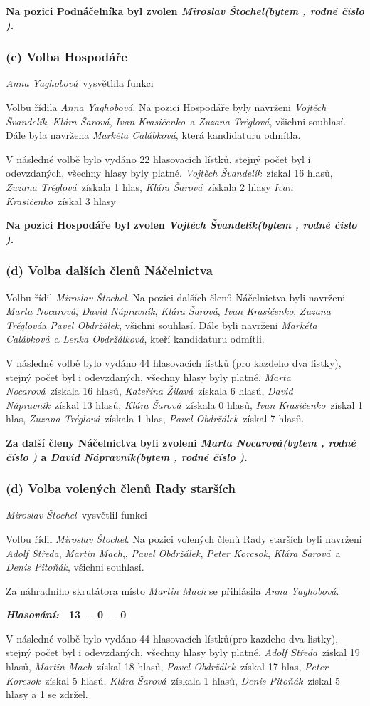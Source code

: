 \documentclass[10pt,a4paper]{report}
\newcommand{\hlas}[3]{
  \begin{flushright}
  {\it\bfseries Hlasování:\/}\ \ {\bfseries #1\ --\ #2\ --\ #3}
  \end{flushright}
}
\newcommand{\pauza}{\vskip 5mm\relax}
\newcommand{\usn}[1]{
  \vskip 5mm\relax
  \noindent{\it\bfseries Usnesení:\/}\nopagebreak
  {\bf #1}
}
\newcommand{\AS}{{\it Adolf Středa\/}}
\newcommand{\AY}{{\it Anna Yaghobová\/}}
\newcommand{\DN}{{\it David Nápravník\/}}
\newcommand{\DP}{{\it Denis Pitoňák\/}}
\newcommand{\IK}{{\it Ivan Krasičenko\/}}
\newcommand{\KZ}{{\it Kateřina Žilavá\/}}
\newcommand{\KS}{{\it Klára Šarová\/}}
\newcommand{\LO}{{\it Lenka Obdržálková\/}}
\newcommand{\MC}{{\it Markéta Calábková\/}}
\newcommand{\MM}{{\it Martin Mach\/}}
\newcommand{\MN}{{\it Marta Nocarová\/}}
\newcommand{\MS}{{\it Miroslav Štochel\/}}
\newcommand{\PO}{{\it Pavel Obdržálek\/}}
\newcommand{\PK}{{\it Peter Korcsok\/}}
\newcommand{\VS}{{\it Vojtěch Švandelík\/}}
\newcommand{\ZT}{{\it Zuzana Tréglová\/}}
\begin{document}
\usn{Na pozici Podnáčelníka byl zvolen
  \MS {\it (bytem \censor{}, rodné číslo \censor{})\/}.}

\subsubsection{(c) Volba Hospodáře}
\AY\ vysvětlila funkci
\pauza

Volbu řídila \AY.
Na pozici Hospodáře byly navrženi \VS, \KS, \IK\ a \ZT, všichni souhlasí.
Dále byla navržena \MC, která kandidaturu odmítla.

V následné volbě bylo vydáno 22 hlasovacích lístků,
stejný počet byl i odevzdaných, všechny hlasy byly platné.
  \VS\ získal 16 hlasů,
  \ZT\ získala 1 hlas,
  \KS\ získala 2 hlasy
  \IK\ získal 3 hlasy
\pauza

\usn{Na pozici Hospodáře byl zvolen
  \VS {\it (bytem \censor{}, rodné číslo \censor{})\/}.}

\subsubsection{(d) Volba dalších členů Náčelnictva}
Volbu řídil \MS.
Na pozici dalších členů Náčelnictva byli navrženi \MN, \DN, \KS, \IK, \ZT a \PO, všichni souhlasí.
Dále byli navrženi \MC\ a \LO, kteří kandidaturu odmítli.
\pauza

V následné volbě bylo vydáno 44 hlasovacích lístků (pro kazdeho dva listky),
stejný počet byl i odevzdaných, všechny hlasy byly platné.
  \MN\ získala 16 hlasů,
  \KZ\ získala 6 hlasů,
  \DN\ získal 13 hlasů,
  \KS\ získala 0 hlasů,
  \IK\ získal 1 hlas,
  \ZT\ získala 1 hlas,
  \PO\ získal 7 hlasů.
\pauza

\usn{Za další členy Náčelnictva byli zvoleni
  \MN {\it (bytem \censor{}, rodné číslo \censor{})\/} a
  \DN {\it (bytem \censor{}, rodné číslo \censor{})\/}.
}

\subsubsection{(d) Volba volených členů Rady starších}
\MS\ vysvětlil funkci
\pauza

Volbu řídil \MS.
Na pozici volených členů Rady starších byli navrženi \AS, \MM,, \PO, \PK, \KS\ a \DP, všichni souhlasí.
\pauza

Za náhradního skrutátora místo {\it \MM} se přihlásila \AY.
\hlas{13}{0}{0}
\pauza

V následné volbě bylo vydáno 44 hlasovacích lístků(pro kazdeho dva listky),
stejný počet byl i odevzdaných, všechny hlasy byly platné.
  \AS\ získal 19 hlasů,
  \MM\ získal 18 hlasů,
  \PO\ získal 17 hlas,
  \PK\ získal 5 hlasů,
  \KS\ získala 1 hlasů,
  \DP\ získal 5 hlasy a
  1 se zdržel.
  
\end{document}
